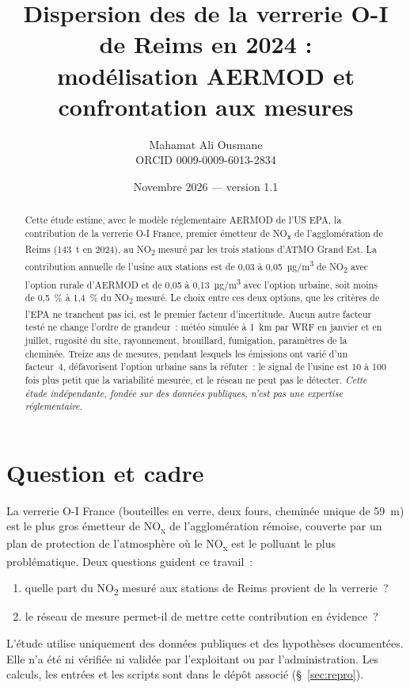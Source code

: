 \documentclass[11pt,a4paper]{article}
\title{Dispersion des \NOx{} de la verrerie O-I de Reims en 2024 :\\modélisation AERMOD et confrontation aux mesures}
\author{Mahamat Ali Ousmane\\{\small ORCID 0009-0009-6013-2834}}
\date{Novembre 2026 — version 1.1}
\newcommand{\NOx}{NO\textsubscript{x}}
\newcommand{\NOd}{NO\textsubscript{2}}
\newcommand{\ugm}{µg/m\textsuperscript{3}}
\begin{document}
\renewcommand{\tablename}{Tableau}\captionsetup{labelsep=period}
\maketitle

\begin{abstract}
\noindent Cette étude estime, avec le modèle réglementaire AERMOD de l'US EPA, la contribution de la verrerie
O-I France, premier émetteur de \NOx{} de l'agglomération de Reims (143~t en 2024), au \NOd{} mesuré par les trois
stations d'ATMO Grand Est. La contribution annuelle de l'usine aux stations est de 0,03 à 0,05~\ugm{} de \NOd{} avec
l'option rurale d'AERMOD et de 0,05 à 0,13~\ugm{} avec l'option urbaine, soit moins de 0,5~\% à 1,4~\% du \NOd{}
mesuré. Le choix entre ces deux options, que les critères de l'EPA ne tranchent pas ici, est le premier facteur
d'incertitude. Aucun autre facteur testé ne change l'ordre de grandeur~: météo simulée à 1~km par WRF en janvier
et en juillet, rugosité du site, rayonnement, brouillard, fumigation, paramètres de la cheminée. Treize ans de
mesures, pendant lesquels les émissions ont varié d'un facteur~4, défavorisent l'option urbaine sans la réfuter~:
le signal de l'usine est 10 à 100 fois plus petit que la variabilité mesurée, et le réseau ne peut pas le
détecter. \textit{Cette étude indépendante, fondée sur des données publiques, n'est pas une expertise réglementaire.}
\end{abstract}

\section{Question et cadre}
La verrerie O-I France (bouteilles en verre, deux fours, cheminée unique de 59~m) est le plus gros émetteur de
\NOx{} de l'agglomération rémoise, couverte par un plan de protection de l'atmosphère où le \NOx{} est le polluant
le plus problématique. Deux questions guident ce travail~:
\begin{enumerate}
\item quelle part du \NOd{} mesuré aux stations de Reims provient de la verrerie~?
\item le réseau de mesure permet-il de mettre cette contribution en évidence~?
\end{enumerate}
L'étude utilise uniquement des données publiques et des hypothèses documentées. Elle n'a été ni vérifiée ni
validée par l'exploitant ou par l'administration. Les calculs, les entrées et les scripts sont dans le dépôt
associé (§~\ref{sec:repro}).
\end{document}
